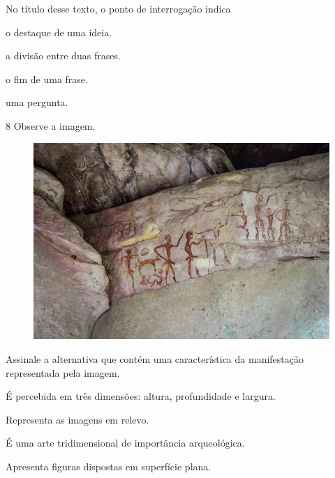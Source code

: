 No título desse texto, o ponto de interrogação indica

\begin{minipage}{.5\textwidth}
\begin{escolha}
\item o destaque de uma ideia.

\item a divisão entre duas frases.

\item o fim de uma frase.

\item uma pergunta.
\end{escolha}
\end{minipage}

\pagebreak
\num{8}  Observe a imagem.

\begin{figure}[htpb!]
\includegraphics[width=\textwidth]{./imgs/art44.png}
\end{figure}


Assinale a alternativa que contém uma característica da manifestação representada pela imagem.

\begin{escolha}
\item
  É percebida em três dimensões: altura, profundidade e largura.
\item
  Representa as imagens em relevo.
\item
  É uma arte tridimensional de importância arqueológica.
\item
  Apresenta figuras dispostas em superfície plana.
\end{escolha}

